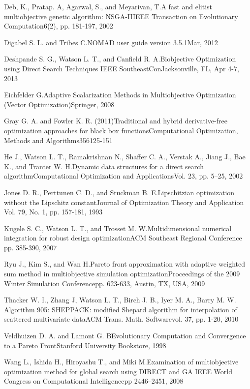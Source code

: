 {Deb, K., Pratap. A, Agarwal, S., and Meyarivan, T.}{A fast and elitist 
multiobjective genetic algorithm: NSGA-II}{IEEE Transaction on Evolutionary 
Computation}{6(2), pp. 181-197, 2002}

{Digabel S. L. and Tribes C.}{NOMAD user guide version 3.5.1}{Mar, 2012}

{Deshpande S. G., Watson L. T., and Canfield R. A.}{Biobjective Optimization 
using Direct Search Techniques }{IEEE SoutheastCon}{Jacksonville, FL, Apr 4-7, 
2013}

{Eichfelder G.}{Adaptive Scalarization Methods in Multiobjective Optimization 
(Vector Optimization)}{Springer, 2008}

{Gray G. A. and Fowler K. R. (2011)}{Traditional and hybrid derivative-free 
optimization approaches for black box functions}{Computational Optimization, 
Methods and Algorithms}{356}{125-151}

{He J., Watson L. T., Ramakrishnan N., Shaffer C. A., Verstak A., Jiang J., 
Bae K., and Tranter W. H.}{Dynamic data structures for a direct search 
algorithm}{Computational Optimization and Applications}{Vol. 23, pp. 5--25, 
2002} 

{Jones D. R., Perttunen  C. D., and Stuckman B. E.}{Lipschitzian optimization
without the Lipschitz constant}{Journal of Optimization Theory and Application} 
{Vol. 79, No. 1, pp. 157-181, 1993}

{Kugele S. C., Watson L. T., and Trosset M. W.}{Multidimensional numerical 
integration for robust design optimization}{ACM Southeast Regional Conference}
{pp. 385-390, 2007}

{Ryu J., Kim S., and Wan H.}{Pareto front approximation with adaptive weighted 
sum method in multiobjective simulation optimization}{Proceedings of the 2009
Winter Simulation Conference}{pp. 623-633, Austin, TX, USA, 2009}

{Thacker W. I., Zhang J, Watson L. T., Birch J. B., Iyer M. A., Barry M. W.}
{Algorithm 905: SHEPPACK: modified Shepard algorithm for interpolation of 
scattered multivariate data}{ACM Trans. Math. Software}{vol. 37, pp. 1-20, 
2010}

{Veldhuizen D. A. and Lamont G. B}{Evolutionary Computation and 
Convergence to a Pareto Front}{Stanford University Bookstore, 1998}

{Wang L., Ishida H., Hiroyashu T., and Miki M.}{Examination of 
multiobjective optimization method for global search using DIRECT and GA}
{IEEE World Congress on Computational Intelligence}{pp 2446--2451, 2008}

\bye
